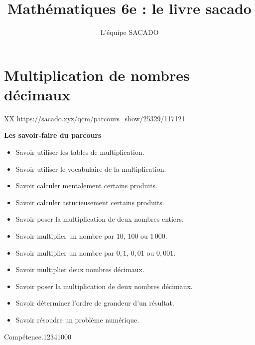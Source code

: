 



\title{Mathématiques 6e  : le livre sacado}
\author{L'équipe SACADO}




\chapter{Multiplication de nombres décimaux}{XX} %
{https://sacado.xyz/qcm/parcours_show/25329/117121}
{
 \begin{CpsCol}
	\textbf{Les savoir-faire du parcours}
 	\begin{itemize}
		\item Savoir utiliser les tables de multiplication.
		\item Savoir utiliser le vocabulaire de la multiplication.
		\item Savoir calculer mentalement certains produits.
		\item Savoir calculer astucieusement certains produits.
		\item Savoir poser la multiplication de deux nombres entiers.
		\item Savoir multiplier un nombre par $10$, $100$ ou $1\, 000$.
		\item Savoir multiplier un nombre par $0,1$, $0,01$ ou $0,001$.
		\item Savoir multiplier deux nombres décimaux.
		\item Savoir poser la multiplication de deux nombres décimaux.
		\item Savoir déterminer l'ordre de grandeur d'un résultat.
		\item Savoir résoudre un problème numérique.
 	\end{itemize}
 \end{CpsCol}

\begin{His}
\end{His}

\begin{ExoDec}{Compétence.}{1234}{1}{0}{0}{0}
\end{ExoDec}
}

